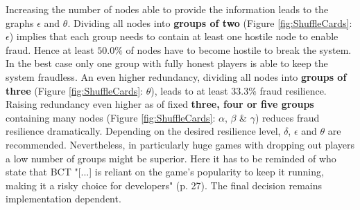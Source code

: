 Increasing the number of nodes able to provide the information leads to the graphs $\epsilon$ and $\theta$.
Dividing all nodes into \textbf{groups of two} (Figure \ref{fig:ShuffleCards}: $\epsilon$) implies that each group needs to contain at least one hostile node to enable fraud.
Hence at least $50.0\%$ of nodes have to become hostile to break the system.
In the best case only one group with fully honest players is able to keep the system fraudless.
An even higher redundancy, dividing all nodes into \textbf{groups of three} (Figure \ref{fig:ShuffleCards}: $\theta$), leads to at least $33.3\%$ fraud resilience.
Raising redundancy even higher as of fixed \textbf{three, four or five groups}
containing many nodes (Figure \ref{fig:ShuffleCards}: $\alpha$, $\beta$ \& $\gamma$) reduces fraud resilience dramatically.
Depending on the desired resilience level, $\delta$, $\epsilon$ and $\theta$ are recommended.
Nevertheless, in particularly huge games with dropping out players a low number of groups might be superior.
Here it has to be reminded of \citet{Laneve.2019} who state that \gls{BCT} "[...] is reliant on the game’s popularity to keep it running, making it a risky choice for developers" (p. 27).
The final decision remains implementation dependent.



\FloatBarrier

